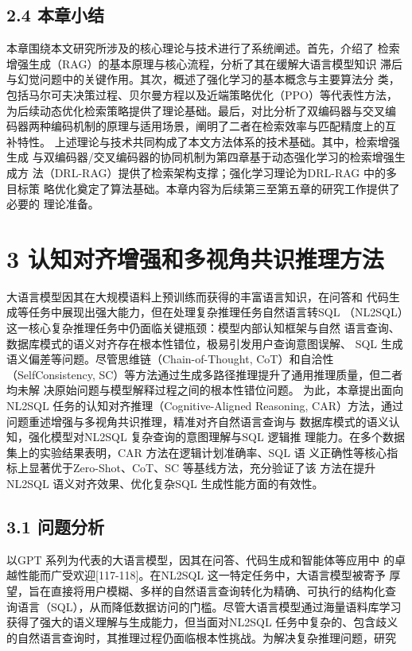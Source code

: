 \documentclass[12pt,a4paper,openright,UTF8]{ctexbook}
\begin{document}
\section{2.4 本章小结}

本章围绕本文研究所涉及的核心理论与技术进行了系统阐述。首先，介绍了 检索增强生成（RAG）的基本原理与核心流程，分析了其在缓解大语言模型知识 滞后与幻觉问题中的关键作用。其次，概述了强化学习的基本概念与主要算法分 类，包括马尔可夫决策过程、贝尔曼方程以及近端策略优化（PPO）等代表性方法， 为后续动态优化检索策略提供了理论基础。最后，对比分析了双编码器与交叉编 码器两种编码机制的原理与适用场景，阐明了二者在检索效率与匹配精度上的互 补特性。 上述理论与技术共同构成了本文方法体系的技术基础。其中，检索增强生成 与双编码器/交叉编码器的协同机制为第四章基于动态强化学习的检索增强生成方 法（DRL-RAG）提供了检索架构支撑；强化学习理论为DRL-RAG 中的多目标策 略优化奠定了算法基础。本章内容为后续第三至第五章的研究工作提供了必要的 理论准备。

\chapter{3 认知对齐增强和多视角共识推理方法}

大语言模型因其在大规模语料上预训练而获得的丰富语言知识，在问答和 代码生成等任务中展现出强大能力，但在处理复杂推理任务自然语言转SQL （NL2SQL）这一核心复杂推理任务中仍面临关键瓶颈：模型内部认知框架与自然 语言查询、数据库模式的语义对齐存在根本性错位，极易引发用户查询意图误解、 SQL 生成语义偏差等问题。尽管思维链（Chain-of-Thought, CoT）和自洽性（SelfConsistency, SC）等方法通过生成多路径推理提升了通用推理质量，但二者均未解 决原始问题与模型解释过程之间的根本性错位问题。 为此，本章提出面向NL2SQL 任务的认知对齐推理（Cognitive-Aligned Reasoning, CAR）方法，通过问题重述增强与多视角共识推理，精准对齐自然语言查询与 数据库模式的语义认知，强化模型对NL2SQL 复杂查询的意图理解与SQL 逻辑推 理能力。在多个数据集上的实验结果表明，CAR 方法在逻辑计划准确率、SQL 语 义正确性等核心指标上显著优于Zero-Shot、CoT、SC 等基线方法，充分验证了该 方法在提升NL2SQL 语义对齐效果、优化复杂SQL 生成性能方面的有效性。

\section{3.1 问题分析}

以GPT 系列为代表的大语言模型，因其在问答、代码生成和智能体等应用中 的卓越性能而广受欢迎[117-118]。在NL2SQL 这一特定任务中，大语言模型被寄予 厚望，旨在直接将用户模糊、多样的自然语言查询转化为精确、可执行的结构化查 询语言（SQL），从而降低数据访问的门槛。尽管大语言模型通过海量语料库学习 获得了强大的语义理解与生成能力，但当面对NL2SQL 任务中复杂的、包含歧义 的自然语言查询时，其推理过程仍面临根本性挑战。为解决复杂推理问题，研究
\end{document}
